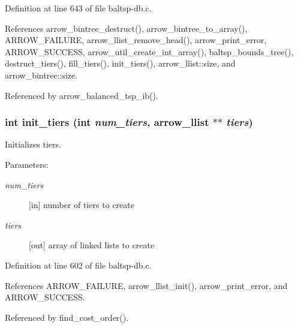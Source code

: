 Definition at line 643 of file baltsp-db.c.

References arrow\_\-bintree\_\-destruct(), arrow\_\-bintree\_\-to\_\-array(), ARROW\_\-FAILURE, arrow\_\-llist\_\-remove\_\-head(), arrow\_\-print\_\-error, ARROW\_\-SUCCESS, arrow\_\-util\_\-create\_\-int\_\-array(), baltsp\_\-bounds\_\-tree(), destruct\_\-tiers(), fill\_\-tiers(), init\_\-tiers(), arrow\_\-llist::size, and arrow\_\-bintree::size.

Referenced by arrow\_\-balanced\_\-tsp\_\-ib().\hypertarget{lib_2baltsp_2baltsp-db_8c_05a2ff158dd6edc613a6623787c04a31}{
\subsubsection[{init\_\-tiers}]{\setlength{\rightskip}{0pt plus 5cm}int init\_\-tiers (int {\em num\_\-tiers}, \/  {\bf arrow\_\-llist} $\ast$$\ast$ {\em tiers})}}
\label{lib_2baltsp_2baltsp-db_8c_05a2ff158dd6edc613a6623787c04a31}


Initializes tiers. 

\begin{Desc}
\item[Parameters:]
\begin{description}
\item[{\em num\_\-tiers}]\mbox{[}in\mbox{]} number of tiers to create \item[{\em tiers}]\mbox{[}out\mbox{]} array of linked lists to create \end{description}
\end{Desc}


Definition at line 602 of file baltsp-db.c.

References ARROW\_\-FAILURE, arrow\_\-llist\_\-init(), arrow\_\-print\_\-error, and ARROW\_\-SUCCESS.

Referenced by find\_\-cost\_\-order().